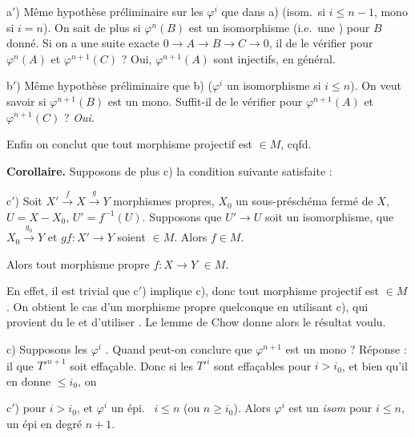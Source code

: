 \documentclass[11pt,a4paper]{article}
\begin{document}
a$'$) Même hypothèse préliminaire sur les $\varphi^{i}$ que dans a) (isom.\ si
$i \leqslant n-1$, mono si $i = n$). On sait de plus si $\varphi^{n}(B)$ est
un isomorphisme (i.e.\ une ) pour $B$ donné. Si on a une
suite exacte $0 \to A \to B \to C \to 0$, il \ill{} de le vérifier pour
$\varphi^{n}(A)$ et $\varphi^{n+1}(C)$ ? Oui, 
$\varphi^{n+1}(A)$ sont injectifs,  en général.

b$'$) Même hypothèse préliminaire que b) ($\varphi^{i}$ un isomorphisme si
$i \leqslant n$). On veut savoir si $\varphi^{n+1}(B)$ est un mono.
Suffit-il de le vérifier pour $\varphi^{n+1}(A)$ et $\varphi^{n+1}(C)$ ?
\emph{Oui}.

Enfin on conclut que tout morphisme projectif  est $\in M$, cqfd.

\textbf{Corollaire.} Supposons  de plus \ill{} c) la
condition suivante satisfaite :

c$'$) Soit $X' \xrightarrow{\ f\ } X \xrightarrow{\ g\ } Y$ \ill{} morphismes
\struck{\ill{}} propres, $X_0$ un sous-préschéma fermé de $X$, $U = X - X_0$,
$U' = f^{-1}(U)$.  Supposons que $U' \to U$ soit un isomorphisme,
 que $X_0 \xrightarrow{\ g_0\ } Y$  et
$gf : X' \to Y$ soient $\in M$. Alors $f \in M$.

Alors tout morphisme propre $f : X \to Y$  $\in M$.

En effet, il est trivial que c$'$) implique c), donc tout morphisme projectif
est $\in M$. On obtient le cas d'un morphisme  propre
quelconque en utilisant c), \ill{} qui provient du \ill{} le
 \ill{}  et d'utiliser \ill{}
. Le lemme \struck{\ill{}} de Chow \ill{} donne alors
le résultat voulu.

c) Supposons les $\varphi^{i}$  
. Quand peut-on conclure que $\varphi^{n+1}$
est un mono ? Réponse : il  que $T'^{n+1}$ soit effaçable.
Donc si les $T'^{i}$ sont effaçables pour $i > i_0$, et bien qu'il en donne
\ill{} $\leqslant i_0$, on \ill{}

c$'$)  \ill{} pour $i > i_0$, et
$\varphi^{i}$ un épi.\ \ill{} $i \leqslant n$ (ou $n \geqslant i_0$). Alors
$\varphi^{i}$ est un  \emph{isom} pour $i \leqslant n$, un épi en
degré $n+1$.
\end{document}
